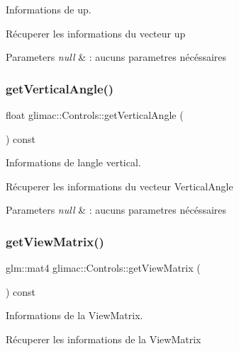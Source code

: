 Informations de up. 

Récuperer les informations du vecteur up


\begin{DoxyParams}{Parameters}
{\em null} & \+: aucuns parametres nécéssaires \\
\hline
\end{DoxyParams}
\mbox{\label{classglimac_1_1Controls_a81093037f816103ce7d22762ac451ff4}} 
\subsubsection{\texorpdfstring{get\+Vertical\+Angle()}{getVerticalAngle()}}
{\footnotesize\ttfamily float glimac\+::\+Controls\+::get\+Vertical\+Angle (\begin{DoxyParamCaption}{ }\end{DoxyParamCaption}) const}



Informations de l\textquotesingle{}angle vertical. 

Récuperer les informations du vecteur Vertical\+Angle


\begin{DoxyParams}{Parameters}
{\em null} & \+: aucuns parametres nécéssaires \\
\hline
\end{DoxyParams}
\mbox{\label{classglimac_1_1Controls_ad2103ef89a2a4166dea80fa11480c324}} 
\subsubsection{\texorpdfstring{get\+View\+Matrix()}{getViewMatrix()}}
{\footnotesize\ttfamily glm\+::mat4 glimac\+::\+Controls\+::get\+View\+Matrix (\begin{DoxyParamCaption}{ }\end{DoxyParamCaption}) const}



Informations de la View\+Matrix. 

Récuperer les informations de la View\+Matrix


